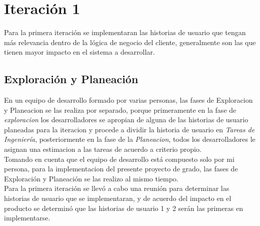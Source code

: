 \section{Iteración 1}
\label{sec:iteracion_1}

Para la primera iteración se implementaran las historias de usuario que tengan más relevancia dentro de la lógica de negocio del cliente, generalmente son las que tienen mayor impacto en el sistema a desarrollar. \\

%

  \subsection{Exploración y Planeación}
  \label{subs:Exploración y Planeación}


En un equipo de desarrollo formado por varias personas, las fases de Exploracion y Planeacion se las realiza por separado, porque primeramente en la fase de \emph{exploracion} los desarrolladores se apropian de alguna de las historias de usuario planeadas para la iteracion y procede a dividir la historia de usuario en \emph{Tareas de Ingeniería}, posteriormente en la fase de la \emph{Planeacion}, todos los desarrolladores le asignan una estimacion a las tareas de acuerdo a criterio propio. \\

Tomando en cuenta que el equipo de desarrollo está compuesto solo por mi persona, para la implementacion del presente proyecto de grado, las fases de Exploración y Planeación se las realizo al mismo tiempo. \\

Para la primera iteración se llevó a cabo una reunión para determinar las historias de usuario que se implementaran, y de acuerdo del impacto en el producto se determinó que las historias de usuario 1 y 2 serán las primeras en implementarse.   \\
%


